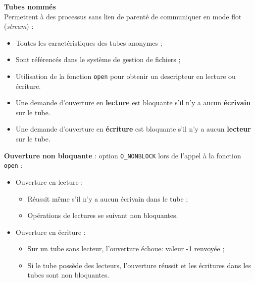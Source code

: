\documentclass[french]{scrartcl}
\begin{document}
\begin{multicols}{3}
\columnbreak
\textbf{Tubes nommés}\\
Permettent à des processus sans lien de parenté de communiquer en mode flot (\emph{stream}) : \begin{itemize}
	\item Toutes les caractéristiques des tubes anonymes ;
	\item Sont référencés dans le système de gestion de fichiers ;
	\item Utilisation de la fonction \lstinline!open! pour obtenir un descripteur en lecture ou écriture.
\end{itemize}



\begin{itemize}
	\item Une demande d'ouverture en \textbf{lecture} est bloquante s'il n'y a aucun \textbf{écrivain} sur le tube.
	\item Une demande d'ouverture en \textbf{écriture} est bloquante s'il n'y a aucun \textbf{lecteur} sur le tube.
\end{itemize}

\vskip 5pt
\textbf{Ouverture non bloquante} : option \lstinline!O_NONBLOCK! lors de l'appel à la fonction \lstinline!open!  :\begin{itemize}
	\item Ouverture en lecture : \begin{itemize}
		\item Réussit même s'il n'y a aucun écrivain dans le tube ;
		\item Opérations de lectures se suivant non bloquantes.
	\end{itemize}
	\item Ouverture en écriture :\begin{itemize}
		\item Sur un tube sans lecteur, l'ouverture échoue: valeur -1 renvoyée ;
		\item Si le tube possède des lecteurs, l'ouverture réussit et les écritures dans les tubes sont non bloquantes. 
	\end{itemize}
\end{itemize}


\end{multicols}
\end{document}
